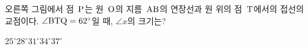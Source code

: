 \noindent\begin{minipage}[t]{0.58\linewidth}\vspace{0pt}\raggedright 오른쪽 그림에서 점~$\mathrm{P}$는 원~$\mathrm{O}$의 지름~$\mathrm{AB}$의 연장선과 원 위의 점~$\mathrm{T}$에서의 접선의 교점이다. $\angle\mathrm{BTQ}=62^\circ$일 때, $\angle x$의 크기는?\end{minipage}\hfill\begin{minipage}[t]{0.4\linewidth}\vspace{0pt}\centering \resizebox{\ifdim\width>\linewidth\linewidth\else\width\fi}{!}{}\end{minipage}\par
\begin{choices32}{$25^\circ$}{$28^\circ$}{$31^\circ$}{$34^\circ$}{$37^\circ$}\end{choices32}
